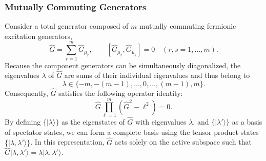 \documentclass[
 reprint,
 amsmath,amssymb,
 aps,
 physrev,
]{revtex4-2}
\begin{document}
\subsubsection{Mutually Commuting Generators}
%
Consider a total generator composed of \( m \) mutually commuting fermionic excitation generators,
%
\begin{equation}
    \hat{G} = \sum_{r=1}^{m} \hat{G}_{\mu_r},
    \qquad
    [\hat{G}_{\mu_r}, \hat{G}_{\mu_s}] = 0
    \quad (r,s = 1,\dots,m).
\end{equation}
%
Because the component generators can be simultaneously diagonalized, the eigenvalues \( \lambda \) of \( \hat{G} \) are sums of their individual eigenvalues and thus belong to
%
\begin{equation}
    \lambda \in \{-m, -(m-1), \dots, 0, \dots, (m-1), m\}.
\end{equation}
%
Consequently, \( \hat{G} \) satisfies the following operator identity:
%
\begin{equation}
    \hat{G} \prod_{\ell=1}^m (\hat{G}^2 - \ell^2) = 0.
\end{equation}
%
By defining \( \{|\lambda\rangle \}  \) as the eigenstates of \( \hat{G} \) with eigenvalues \( \lambda \), and \( \{|\lambda'\rangle \} \) as a basis of spectator states, we can form a complete basis using the tensor product states \( \{|\lambda, \lambda'\rangle \} \). In this representation, \( \hat{G} \) acts solely on the active subspace such that \( \hat{G} |\lambda, \lambda'\rangle = \lambda |\lambda, \lambda'\rangle \).
%
\end{document}
